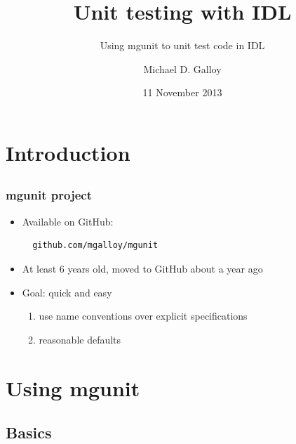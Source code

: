 \documentclass[12pt, handout]{beamer}
\title{Unit testing with IDL}
\subtitle{Using mgunit to unit test code in IDL}
\author{Michael D. Galloy}
\institute[Tech-X Corporation]{Tech-X Corporation\\ Boulder, CO}
\date{11 November 2013}
\begin{document}
\begin{frame}[plain]
  \titlepage
\end{frame}


\section{Introduction}
\subsection*{}

\begin{frame}
  \tableofcontents
\end{frame}

\begin{frame}[t, fragile]
  \frametitle{mgunit project}
  \begin{itemize}
    \item Available on GitHub:

\begin{lstlisting}
  github.com/mgalloy/mgunit
\end{lstlisting}

    \item At least 6 years old, moved to GitHub about a year ago
    \item Goal: quick and easy
    \begin{enumerate}
      \item use name conventions over explicit specifications
      \item reasonable defaults
    \end{enumerate}
  \end{itemize}
\end{frame}


\section{Using mgunit}
\subsection{Basics}
\end{document}
